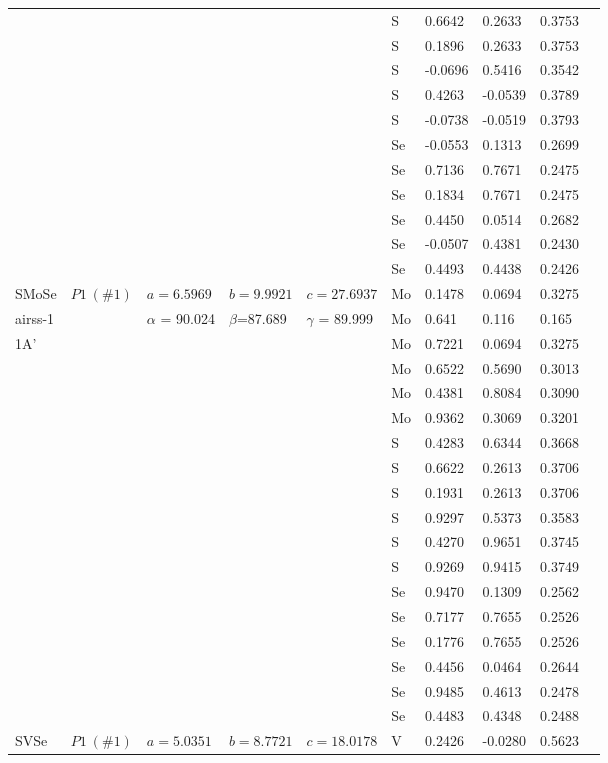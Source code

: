 \documentclass[a4paperm]{article}
\begin{document}
\begin{table}[H]
\begin{tabular}{l*{9}{l}}
	&&&&&	S	&	0.6642	&	0.2633	&	0.3753	\\
	&&&&&	S	&	0.1896	&	0.2633	&	0.3753	\\
	&&&&&	S	&	-0.0696	&	0.5416	&	0.3542	\\
	&&&&&	S	&	0.4263	&	-0.0539	&	0.3789	\\
	&&&&&	S	&	-0.0738	&	-0.0519	&	0.3793	\\
	&&&&&	Se	&	-0.0553	&	0.1313	&	0.2699	\\
	&&&&&	Se	&	0.7136	&	0.7671	&	0.2475	\\
	&&&&&	Se	&	0.1834	&	0.7671	&	0.2475	\\
	&&&&&	Se	&	0.4450	&	0.0514	&	0.2682	\\
	&&&&&	Se	&	-0.0507	&	0.4381	&	0.2430	\\
	&&&&&	Se	&	0.4493	&	0.4438	&	0.2426	\\
		\hline 
		SMoSe & $P1\ (\#1)$  &	$a=6.5969$ & $b=9.9921$ & $c=27.6937$  & Mo  &0.1478 &0.0694  &0.3275 \\
		airss-1&&$\alpha$ = 90.024& $\beta$=87.689& $\gamma$ = 89.999& Mo &0.641 &0.116 &0.165\\
     1A'&&&&&	Mo	&	0.7221	&	0.0694	&	0.3275	\\
		&&&&&	Mo	&	0.6522	&	0.5690	&	0.3013	\\
		&&&&&	Mo	&	0.4381	&	0.8084	&	0.3090	\\
		&&&&&	Mo	&	0.9362	&	0.3069	&	0.3201	\\
		&&&&&	S	&	0.4283	&	0.6344	&	0.3668	\\
		&&&&&	S	&	0.6622	&	0.2613	&	0.3706	\\
		&&&&&	S	&	0.1931	&	0.2613	&	0.3706	\\
		&&&&&	S	&	0.9297	&	0.5373	&	0.3583	\\
		&&&&&	S	&	0.4270	&	0.9651	&	0.3745	\\
		&&&&&	S	&	0.9269	&	0.9415	&	0.3749	\\
		&&&&&	Se	&	0.9470	&	0.1309	&	0.2562	\\
		&&&&&	Se	&	0.7177	&	0.7655	&	0.2526	\\
		&&&&&	Se	&	0.1776	&	0.7655	&	0.2526	\\
		&&&&&	Se	&	0.4456	&	0.0464	&	0.2644	\\
		&&&&&	Se	&	0.9485	&	0.4613	&	0.2478	\\
		&&&&&	Se	&	0.4483	&	0.4348	&	0.2488	\\
		\hline
		SVSe & $P1\ (\#1)$  &	$a=5.0351$ & $b=8.7721$ & $c=18.0178$  & V	&	0.2426	&	-0.0280	&	0.5623	\\

\end{tabular}
\end{table}
\end{document}
